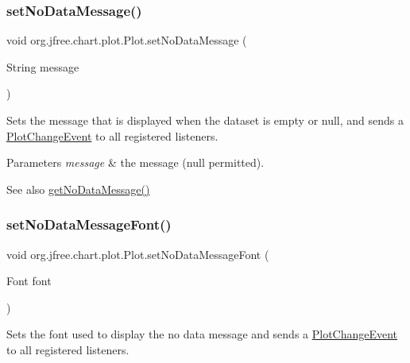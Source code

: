\subsubsection{\texorpdfstring{set\+No\+Data\+Message()}{setNoDataMessage()}}
{\footnotesize\ttfamily void org.\+jfree.\+chart.\+plot.\+Plot.\+set\+No\+Data\+Message (\begin{DoxyParamCaption}\item[{String}]{message }\end{DoxyParamCaption})}

Sets the message that is displayed when the dataset is empty or {\ttfamily null}, and sends a \mbox{\hyperlink{}{Plot\+Change\+Event}} to all registered listeners.


\begin{DoxyParams}{Parameters}
{\em message} & the message ({\ttfamily null} permitted).\\
\hline
\end{DoxyParams}
\begin{DoxySeeAlso}{See also}
\mbox{\hyperlink{classorg_1_1jfree_1_1chart_1_1plot_1_1_plot_a6a121d914481157af8e29f372ff130eb}{get\+No\+Data\+Message()}} 
\end{DoxySeeAlso}
\mbox{\label{classorg_1_1jfree_1_1chart_1_1plot_1_1_plot_ac65a69bf34be07947529f145f8ede35e}} 
\subsubsection{\texorpdfstring{set\+No\+Data\+Message\+Font()}{setNoDataMessageFont()}}
{\footnotesize\ttfamily void org.\+jfree.\+chart.\+plot.\+Plot.\+set\+No\+Data\+Message\+Font (\begin{DoxyParamCaption}\item[{Font}]{font }\end{DoxyParamCaption})}

Sets the font used to display the \textquotesingle{}no data\textquotesingle{} message and sends a \mbox{\hyperlink{}{Plot\+Change\+Event}} to all registered listeners.


